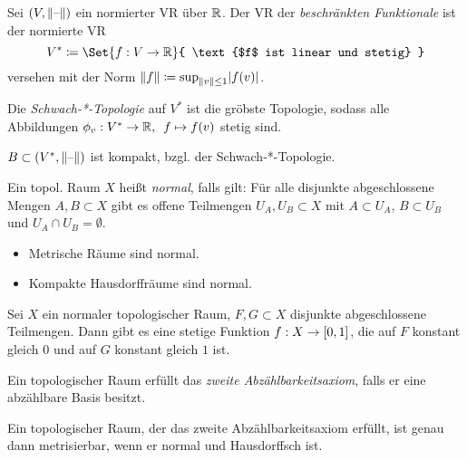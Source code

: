 \documentclass{cheat-sheet}
\begin{document}
\begin{defn}
  Sei $(V, \lVert\text{--}\rVert)$ ein normierter VR über $\mathbb{R}$. Der VR der \emph{beschränkten Funktionale} ist der normierte VR
  \[ V^* \coloneqq \Set{ f : V \to \R }{ \text{$f$ ist linear und stetig} } \]
  versehen mit der Norm $\lVert f\rVert \coloneqq \sup_{\lVert v\rVert \leq 1} \lvert f(v)\rvert$.
\end{defn}

\begin{defn}
  Die \emph{Schwach-*-Topologie} auf $V^*$ ist die gröbste Topologie, sodass alle Abbildungen $\phi_v : V^* \to \mathbb{R}, \enspace f \mapsto f(v)$ stetig sind.
\end{defn}

\begin{satz}
  $B \subset (V^*, \lVert\text{--}\rVert)$ ist kompakt, bzgl. der Schwach-*-Topologie.
\end{satz}


\begin{defn}
  Ein topol. Raum $X$ heißt \emph{normal}, falls gilt: Für alle disjunkte abgeschlossene Mengen $A, B \subset X$ gibt es offene Teilmengen $U_A, U_B \subset X$ mit $A \subset U_A$, $B \subset U_B$ und $U_A \cap U_B = \emptyset$.
\end{defn}

\begin{bspe}
  \begin{itemize}
    \item Metrische Räume sind normal.
    \item Kompakte Hausdorffräume sind normal.
  \end{itemize}
\end{bspe}

\begin{lem}[Urysohn]
  Sei $X$ ein normaler topologischer Raum, $F, G \subset X$ disjunkte abgeschlossene Teilmengen. Dann gibt es eine stetige Funktion $f : X \to \left[ 0, 1 \right]$, die auf $F$ konstant gleich $0$ und auf $G$ konstant gleich $1$ ist.
\end{lem}

\begin{defn}
  Ein topologischer Raum erfüllt das \emph{zweite Abzählbarkeitsaxiom}, falls er eine abzählbare Basis besitzt.
\end{defn}

\begin{satz}
  Ein topologischer Raum, der das zweite Abzählbarkeitsaxiom erfüllt, ist genau dann metrisierbar, wenn er normal und Hausdorffsch ist.
\end{satz}
\end{document}
